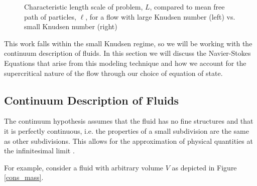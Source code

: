 \begin{figure}[h!]
\begin{center}
\end{center}
\caption{Characteristic length scale of problem, $L$, compared to mean free path of particles, $\ell$, for a flow with large Knudsen number (left) vs. small Knudsen number (right)}
\label{Knudsen_example}
\end{figure}

This work falls within the small Knudsen regime, so we will be working with the continuum description of fluids. In this section we will discuss the Navier-Stokes Equations that arise from this modeling technique and how we account for the supercritical nature of the flow through our choice of equation of state. 

\subsection{Continuum Description of Fluids}
The continuum hypothesis assumes that the fluid has no fine structures and that it is perfectly continuous, i.e. the properties of a small subdivision are the same as other subdivisions. This allows for the approximation of physical quantities at the infinitesimal limit \cite{cont}.

For example, consider a fluid with arbitrary volume $V$ as depicted in Figure \ref{cons_mass}.  


